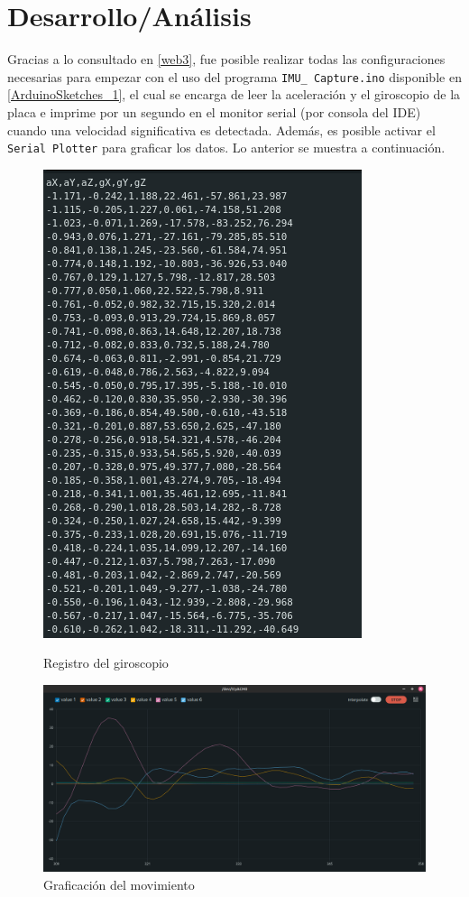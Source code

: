 \section{Desarrollo/Análisis}
Gracias a lo consultado en \ref{web3}, fue posible realizar todas las configuraciones necesarias para empezar con el uso del programa \texttt{IMU\_ Capture.ino} disponible en \ref{ArduinoSketches_1}, el cual se encarga de leer la aceleración y el giroscopio de la placa e imprime por un segundo en el monitor serial (por consola del IDE) cuando una velocidad significativa es detectada. Además, es posible activar el \texttt{Serial Plotter} para graficar los datos. Lo anterior se muestra a continuación.

\begin{figure}[H]
   \begin{minipage}{0.48\textwidth}
     \centering
     \includegraphics[width=.7\linewidth]{Imagenes/4}
     \caption{ Registro del giroscopio}\label{Fig_4}
   \end{minipage}\hfill
   \begin{minipage}{0.7\textwidth}
     \centering
     \includegraphics[width=.7\linewidth]{Imagenes/5.png}
     \caption{Graficación del movimiento }\label{Fig_5}
   \end{minipage}
\end{figure}
